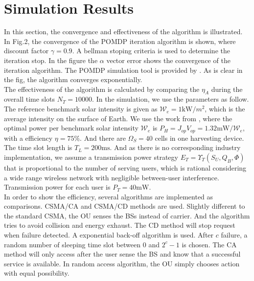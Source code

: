 \documentclass[conference]{IEEEtran}
\begin{document}
\section{Simulation Results}
In this section, the convergence and effectiveness of the algorithm is illustrated.
In Fig.2, the convergence of the POMDP iteration algorithm is shown, where discount factor \(\gamma = 0.9\).
A bellman stoping criteria is used to determine the iteration stop.
In the figure the \(\alpha\) vector error shows the convergence of the iteration algorithm.
The POMDP simulation tool is provided by \cite{pomdptool}.
As is clear in the fig, the algorithm converges exponentially.\\
\indent The effectiveness of the algorithm is calculated by comparing the \(\eta_A\)
during the overall time slots \(N_T = 10000\).
In the simulation, we use the parameters as follow.
The reference benchmark solar intensity is given as \(\mathcal{W}_e = 1\mbox{kW}/m^2\),
which is the average intensity on the surface of Earth\cite{electric}.
We use the work from \cite{circuit}, where the optimal power per benchmark solar intensity \(\mathcal{W}_e\)
is \(P_H = J_{op}V_{op} = 1.32\mbox{mW}/\mathcal{W}_e\), with a efficiency \(\eta = 75 \%\).
And there are \(\Omega_S = 40\) cells in one harvesting device.
The time slot length is \(T_L = 200\mbox{ms}\).
And as there is no corresponding industry implementation,
we assume a transmission power strategy \(E_T = \Upsilon_T(S_U, Q_B, \Phi)\)
that is proportional to the number of serving users,
which is rational considering a wide range wireless network with negligible between-user interference.
Transmission power for each user is \(P_T = 40\mbox{mW}\).\\
\indent In order to show the efficiency, several algorithms are implemented as comparisons.
CSMA/CA and CSMA/CD methods are used.
Slightly different to the standard CSMA, the OU senses the BSs instead of carrier.
And the algorithm tries to avoid collision and energy exhaust.
The CD method will stop request when failure detected. A exponential back-off algorithm is used.
After \(c\) failure, a random number of sleeping time slot between \(0\) and \(2^c - 1\) is chosen.
The CA method will only access after the user sense the BS and know that a successful service is available.
In random access algorithm, the OU simply chooses action with equal possibility.\\
\end{document}
